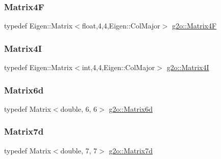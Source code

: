 \mbox{\label{namespaceg2o_afe979d0d6b88b375b29c06eb49df71fb}} 
\subsubsection{\texorpdfstring{Matrix4F}{Matrix4F}}
{\footnotesize\ttfamily typedef Eigen\+::\+Matrix$<$float,4,4,Eigen\+::\+Col\+Major$>$ \mbox{\hyperlink{namespaceg2o_afe979d0d6b88b375b29c06eb49df71fb}{g2o\+::\+Matrix4F}}}

\mbox{\label{namespaceg2o_a10216d68ff0555e64c628cf7f5f3bb7a}} 
\subsubsection{\texorpdfstring{Matrix4I}{Matrix4I}}
{\footnotesize\ttfamily typedef Eigen\+::\+Matrix$<$int,4,4,Eigen\+::\+Col\+Major$>$ \mbox{\hyperlink{namespaceg2o_a10216d68ff0555e64c628cf7f5f3bb7a}{g2o\+::\+Matrix4I}}}

\mbox{\label{namespaceg2o_afff8bcc18e5be58eef0961900ddda24b}} 
\subsubsection{\texorpdfstring{Matrix6d}{Matrix6d}}
{\footnotesize\ttfamily typedef Matrix$<$double, 6, 6$>$ \mbox{\hyperlink{namespaceg2o_afff8bcc18e5be58eef0961900ddda24b}{g2o\+::\+Matrix6d}}}

\mbox{\label{namespaceg2o_a3ce3dfdcb313ec3483b8cee099402e54}} 
\subsubsection{\texorpdfstring{Matrix7d}{Matrix7d}}
{\footnotesize\ttfamily typedef Matrix$<$double, 7, 7$>$ \mbox{\hyperlink{namespaceg2o_a3ce3dfdcb313ec3483b8cee099402e54}{g2o\+::\+Matrix7d}}}

\mbox{\label{namespaceg2o_a8a808fe01b0b4e0afe637fe680853d0a}} 
